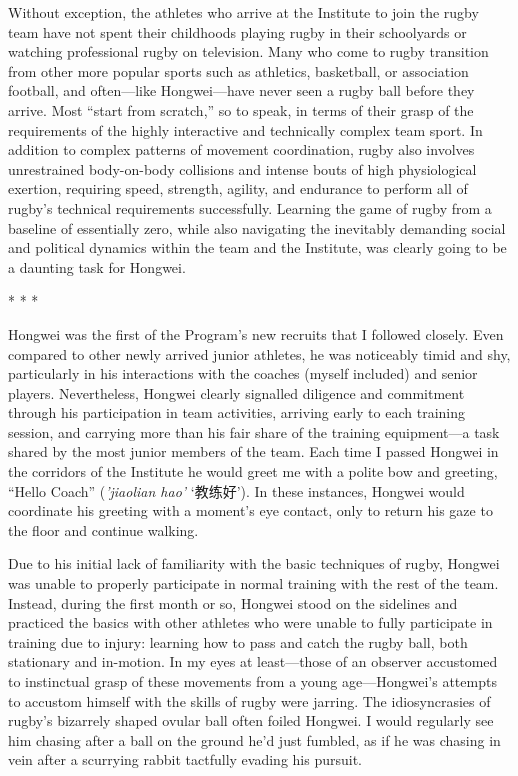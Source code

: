 \begin{CJK}{UTF8}{gbsn}
Without exception, the athletes who arrive at the Institute to join the rugby team have not spent their childhoods playing rugby in their schoolyards or watching professional rugby on television. Many who come to rugby transition from other more popular sports such as athletics, basketball, or association football, and often---like Hongwei---have never seen a rugby ball before they arrive.  Most ``start from scratch,'' so to speak, in terms of their grasp of the requirements of the highly interactive and technically complex team sport. In addition to complex patterns of movement coordination, rugby also involves unrestrained body-on-body collisions and intense bouts of high physiological exertion, requiring speed, strength, agility, and endurance to perform all of rugby's technical requirements successfully.  Learning the game of rugby from a baseline of essentially zero, while also navigating the inevitably demanding  social and political dynamics within the team and the Institute, was clearly going to be a daunting task for Hongwei.

                        \begin{center}
                          * * *
                        \end{center}

Hongwei was the first of the Program’s new recruits that I followed closely.  Even compared to other newly arrived junior athletes, he was noticeably timid and shy, particularly in his interactions with the coaches (myself included) and senior players. Nevertheless, Hongwei clearly signalled diligence and commitment through his participation in team activities, arriving early to each training session, and carrying more than his fair share of the training equipment---a task shared by the most junior members of the team.  Each time I passed Hongwei in the corridors of the Institute he would greet me with a polite bow and greeting, ``Hello Coach'' (\textit{'jiaolian hao'} `教练好').  In these instances, Hongwei would coordinate his greeting with a moment's eye contact, only to return his gaze to the floor and continue walking.

Due to his initial lack of familiarity with the basic techniques of rugby, Hongwei was unable to properly participate in normal training with the rest of the team.  Instead, during the first month or so, Hongwei stood on the sidelines and practiced the basics with other athletes who were unable to fully participate in training due to injury: learning how to pass and catch the rugby ball, both stationary and in-motion. In my eyes at least---those of an observer accustomed to instinctual grasp of these movements from a young age---Hongwei's attempts to accustom himself with the skills of rugby were jarring.  The idiosyncrasies of rugby's bizarrely shaped ovular ball often foiled Hongwei. I would regularly see him chasing after a ball on the ground he'd just fumbled, as if he was chasing in vein after a scurrying rabbit tactfully evading his pursuit.


\end{CJK}
